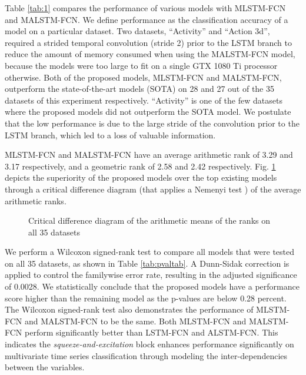 \documentclass[preprint,12pt,3p]{elsarticle}
\begin{document}

Table \ref{tab:1} compares the performance of various models with MLSTM-FCN and MALSTM-FCN. We define performance as the classification accuracy of a model on a particular dataset. Two datasets, ``Activity'' and ``Action 3d'', required a strided temporal convolution (stride 2) prior to the LSTM branch to reduce the amount of memory consumed when using the MALSTM-FCN model, because the models were too large to fit on a single GTX 1080 Ti processor otherwise. Both of the proposed models, MLSTM-FCN and MALSTM-FCN, outperform the state-of-the-art models (SOTA) on 28 and 27 out of the 35 datasets of this experiment respectively. ``Activity'' is one of the few datasets where the proposed models did not outperform the SOTA model. We postulate that the low performance is due to the large stride of the convolution prior to the LSTM branch, which led to a loss of valuable information.

MLSTM-FCN and MALSTM-FCN have an average arithmetic rank of 3.29 and 3.17 respectively, and a geometric rank of 2.58 and 2.42 respectively. Fig. \ref{fig:critical_diff} depicts the superiority of the proposed models over the top existing models through a critical difference diagram (that applies a Nemenyi test \cite{nemenyi1962distribution}) of the average arithmetic ranks. 

\begin{figure}[htpb]
\centering
{}
\caption{Critical difference diagram of the arithmetic means of the ranks on all 35 datasets}
\label{fig:critical_diff}

\end{figure}

We perform a Wilcoxon signed-rank test to compare all models that were tested on all 35 datasets, as shown in Table \ref{tab:pvaltab}. A  Dunn-Sidak correction \cite{vsidak1967rectangular} is applied to control the familywise error rate, resulting in the adjusted significance of 0.0028. We statistically conclude that the proposed models have a performance score higher than the remaining model as the p-values are below 0.28 percent. The Wilcoxon signed-rank test also demonstrates the performance of MLSTM-FCN and MALSTM-FCN to be the same. Both MLSTM-FCN and MALSTM-FCN perform significantly better than LSTM-FCN and ALSTM-FCN. This indicates the \textit{squeeze-and-excitation} block enhances performance significantly on multivariate time series classification through modeling the inter-dependencies between the variables.
\end{document}

